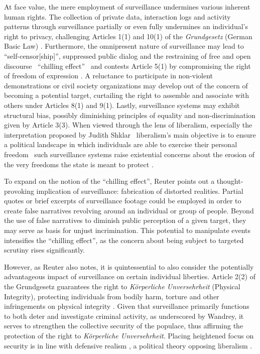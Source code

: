 \documentclass[12pt]{article}
\begin{document}
	At face value, the mere employment of surveillance undermines various inherent human rights. The collection of private data, interaction logs and activity patterns through surveillance partially or even fully undermines an individual's right to privacy, challenging Articles 1(1) and 10(1) of the \textit{Grundgesetz} (German Basic Law) \parencites{nandy2023, wetzling2023, grundgesetz2025}. Furthermore, the omnipresent nature of surveillance may lead to ``self-censor[ship]'', suppressed public dialog and the restraining of free and open discourse \textemdash\ ``chilling effect'' \textemdash\ and contests Article 5(1) by compromising the right of freedom of expression \parencite{murray2024}. A reluctance to participate in non-violent demonstrations or civil society organizations may develop out of the concern of becoming a potential target, curtailing the right to assemble and associate with others under Articles 8(1) and 9(1). Lastly, surveillance systems may exhibit structural bias, possibly diminishing principles of equality and non-discrimination given by Article 3(3). When viewed through the lens of liberalism, especially the interpretation proposed by Judith Shklar \textemdash\ liberalism's main objective is to ensure a political landscape in which individuals are able to exercise their personal freedom \textemdash\ such surveillance systems raise existential concerns about the erosion of the very freedoms the state is meant to protect \parencite[684]{bell2014}.
	
	To expand on the notion of the ``chilling effect'', Reuter points out a thought-provoking implication of surveillance: fabrication of distorted realities. Partial quotes or brief excerpts of surveillance footage could be employed in order to create false narratives revolving around an individual or group of people. Beyond the use of false narratives to diminish public perception of a given target, they may serve as basis for unjust incrimination. This potential to manipulate events intensifies the ``chilling effect'', as the concern about being subject to targeted scrutiny rises significantly. 
	
	However, as Reuter also notes, it is quintessential to also consider the potentially advantageous impact of surveillance on certain individual liberties. Article 2(2) of the Grundgesetz guarantees the right to \textit{Körperliche Unversehrheit} (Physical Integrity), protecting individuals from bodily harm, torture and other infringements on physical integrity \parencite{bildung_korperliche_nodate}. Given that surveillance primarily functions to both deter and investigate criminal activity, as underscored by Wandrey, it serves to strengthen the collective security of the populace, thus affirming the protection of the right to \textit{Körperliche Unversehrheit}. Placing heightened focus on security is in line with defensive realism \parencite{courseCompanion2024}, a political theory opposing liberalism \parencite{jumarang2011}.  
	
\end{document}
